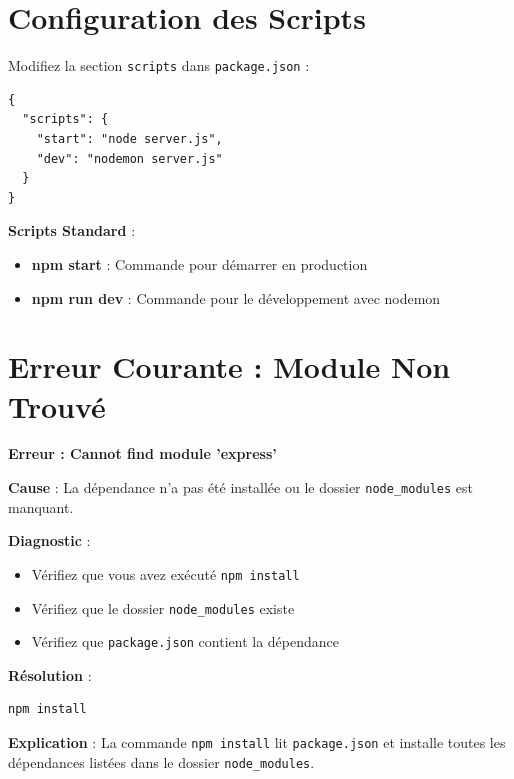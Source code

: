 \section{Configuration des Scripts}

Modifiez la section \texttt{scripts} dans \texttt{package.json} :

\begin{lstlisting}[style=javascript, caption=Configuration des scripts dans package.json]
{
  "scripts": {
    "start": "node server.js",
    "dev": "nodemon server.js"
  }
}
\end{lstlisting}

\begin{bestpracticebox}
    \textbf{Scripts Standard} :
    \begin{itemize}
        \item \textbf{npm start} : Commande pour démarrer en production
        \item \textbf{npm run dev} : Commande pour le développement avec nodemon
    \end{itemize}
\end{bestpracticebox}

\section{Erreur Courante : Module Non Trouvé}

\begin{errorbox}
    \textbf{Erreur : Cannot find module 'express'}
    
    \textbf{Cause} : La dépendance n'a pas été installée ou le dossier \texttt{node\_modules} est manquant.
    
    \textbf{Diagnostic} :
    \begin{itemize}
        \item Vérifiez que vous avez exécuté \texttt{npm install}
        \item Vérifiez que le dossier \texttt{node\_modules} existe
        \item Vérifiez que \texttt{package.json} contient la dépendance
    \end{itemize}
    
    \textbf{Résolution} :
    \begin{lstlisting}[style=bash]
npm install
    \end{lstlisting}
    
    \textbf{Explication} : La commande \texttt{npm install} lit \texttt{package.json} et installe toutes les dépendances listées dans le dossier \texttt{node\_modules}.
\end{errorbox}

